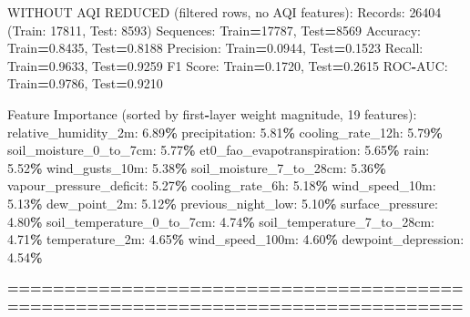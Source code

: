 \documentclass[
  letterpaper,
  DIV=11,
  numbers=noendperiod]{scrartcl}
\newenvironment{Shaded}{\begin{snugshade}}{\end{snugshade}}
\newcommand{\BuiltInTok}[1]{#1}
\newcommand{\DecValTok}[1]{\textcolor[rgb]{0.00,0.00,0.81}{#1}}
\newcommand{\FloatTok}[1]{\textcolor[rgb]{0.00,0.00,0.81}{#1}}
\newcommand{\NormalTok}[1]{#1}
\newcommand{\OperatorTok}[1]{\textcolor[rgb]{0.81,0.36,0.00}{\textbf{#1}}}
\begin{document}
\begin{Shaded}
\begin{Highlighting}[]
\NormalTok{WITHOUT AQI REDUCED (filtered rows, no AQI features):}
\NormalTok{  Records: }\DecValTok{26404}\NormalTok{ (Train: }\DecValTok{17811}\NormalTok{, Test: }\DecValTok{8593}\NormalTok{)}
\NormalTok{  Sequences: Train}\OperatorTok{=}\DecValTok{17787}\NormalTok{, Test}\OperatorTok{=}\DecValTok{8569}
\NormalTok{  Accuracy: Train}\OperatorTok{=}\FloatTok{0.8435}\NormalTok{, Test}\OperatorTok{=}\FloatTok{0.8188}
\NormalTok{  Precision: Train}\OperatorTok{=}\FloatTok{0.0944}\NormalTok{, Test}\OperatorTok{=}\FloatTok{0.1523}
\NormalTok{  Recall: Train}\OperatorTok{=}\FloatTok{0.9633}\NormalTok{, Test}\OperatorTok{=}\FloatTok{0.9259}
\NormalTok{  F1 Score: Train}\OperatorTok{=}\FloatTok{0.1720}\NormalTok{, Test}\OperatorTok{=}\FloatTok{0.2615}
\NormalTok{  ROC}\OperatorTok{{-}}\NormalTok{AUC: Train}\OperatorTok{=}\FloatTok{0.9786}\NormalTok{, Test}\OperatorTok{=}\FloatTok{0.9210}

\NormalTok{  Feature Importance (}\BuiltInTok{sorted}\NormalTok{ by first}\OperatorTok{{-}}\NormalTok{layer weight magnitude, }\DecValTok{19}\NormalTok{ features):}
\NormalTok{    relative\_humidity\_2m: }\FloatTok{6.89}\OperatorTok{\%}
\NormalTok{    precipitation: }\FloatTok{5.81}\OperatorTok{\%}
\NormalTok{    cooling\_rate\_12h: }\FloatTok{5.79}\OperatorTok{\%}
\NormalTok{    soil\_moisture\_0\_to\_7cm: }\FloatTok{5.77}\OperatorTok{\%}
\NormalTok{    et0\_fao\_evapotranspiration: }\FloatTok{5.65}\OperatorTok{\%}
\NormalTok{    rain: }\FloatTok{5.52}\OperatorTok{\%}
\NormalTok{    wind\_gusts\_10m: }\FloatTok{5.38}\OperatorTok{\%}
\NormalTok{    soil\_moisture\_7\_to\_28cm: }\FloatTok{5.36}\OperatorTok{\%}
\NormalTok{    vapour\_pressure\_deficit: }\FloatTok{5.27}\OperatorTok{\%}
\NormalTok{    cooling\_rate\_6h: }\FloatTok{5.18}\OperatorTok{\%}
\NormalTok{    wind\_speed\_10m: }\FloatTok{5.13}\OperatorTok{\%}
\NormalTok{    dew\_point\_2m: }\FloatTok{5.12}\OperatorTok{\%}
\NormalTok{    previous\_night\_low: }\FloatTok{5.10}\OperatorTok{\%}
\NormalTok{    surface\_pressure: }\FloatTok{4.80}\OperatorTok{\%}
\NormalTok{    soil\_temperature\_0\_to\_7cm: }\FloatTok{4.74}\OperatorTok{\%}
\NormalTok{    soil\_temperature\_7\_to\_28cm: }\FloatTok{4.71}\OperatorTok{\%}
\NormalTok{    temperature\_2m: }\FloatTok{4.65}\OperatorTok{\%}
\NormalTok{    wind\_speed\_100m: }\FloatTok{4.60}\OperatorTok{\%}
\NormalTok{    dewpoint\_depression: }\FloatTok{4.54}\OperatorTok{\%}

\OperatorTok{================================================================================}


\end{Highlighting}
\end{Shaded}
\end{document}
